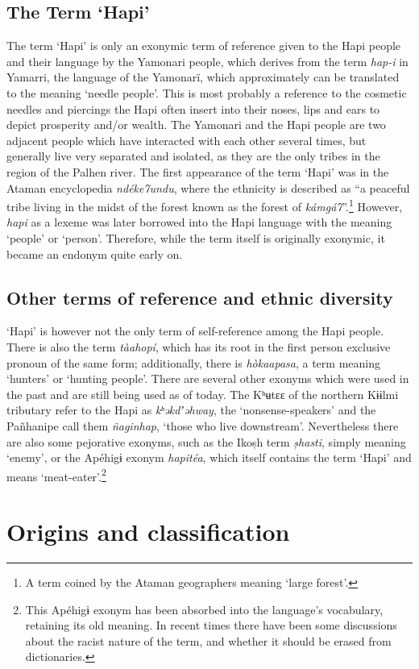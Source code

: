 \documentclass[a4paper, 12pt, oneside]{memoir}
\newcommand{\peoplef}{Hapi }
\newcommand{\emh}[1]{\textit{#1}}
\begin{document}
\subsection{The Term `Hapi'}
The term `Hapi' is only an exonymic term of reference given to the \peoplef people and their language by the Yamonari people, which derives from the term \emh{hap-i} in Yamarri, the language of the Yamonarï, which approximately can be translated to the meaning `needle people'. This is most probably a reference to the cosmetic needles and piercings the \peoplef often insert into their noses, lips and ears to depict prosperity and/or wealth. The Yamonari and the \peoplef people are two adjacent people which have interacted with each other several times, but generally live very separated and isolated, as they are the only tribes in the region of the Palhen river. 
The first appearance of the term `Hapi' was in the Ataman encyclopedia \textit{ndéke7undu}, where the ethnicity is described as ``a peaceful tribe living in the midst of the forest known as the forest of \textit{kámgá7}''.\footnote{A term coined by the Ataman geographers meaning `large forest'.} However, \emh{hapi} as a lexeme was later borrowed into the Hapi language with the meaning `people' or `person'. Therefore, while the term itself is originally exonymic, it became an endonym quite early on.
\subsection{Other terms of reference and ethnic diversity}
`Hapi' is however not the only term of self-reference among the Hapi people. There is also the term \emh{tàahopí}, which has its root in the first person exclusive pronoun of the same form; additionally, there is \emh{hòkaapasa}, a term meaning `hunters' or `hunting people'.
There are several other exonyms which were used in the past and are still being used as of today. The Kʰʉtɛɛ of the northern Kɨɨlmi tributary refer to the Hapi as \emh{kʰəkdʼəhway}, the `nonsense-speakers' and the Pañhanipe call them \emh{ñaginhap}, `those who live downstream'. Nevertheless there are also some  pejorative exonyms, such as the Ikoșh term \emh{șhasti}, simply meaning `enemy', or the Apéhigɨ exonym \emh{hapitéa}, which itself contains the term `Hapi' and means `meat-eater'.\footnote{This Apéhigɨ exonym has been absorbed into the language's vocabulary, retaining its old meaning. In recent times there have been some discussions about the racist nature of the term, and whether it should be erased from dictionaries.}
\section{Origins and classification}\label{sorigins}
\end{document}
